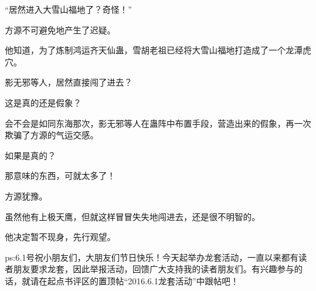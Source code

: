 \begin{this_body}
“居然进入大雪山福地了？奇怪！”

方源不可避免地产生了迟疑。

他知道，为了炼制鸿运齐天仙蛊，雪胡老祖已经将大雪山福地打造成了一个龙潭虎穴。

影无邪等人，居然直接闯了进去？

这是真的还是假象？

会不会是如同东海那次，影无邪等人在蛊阵中布置手段，营造出来的假象，再一次欺骗了方源的气运交感。

如果是真的？

那意味的东西，可就太多了！

方源犹豫。

虽然他有上极天鹰，但就这样冒冒失失地闯进去，还是很不明智的。

他决定暂不现身，先行观望。

ps:6.1号祝小朋友们，大朋友们节日快乐！今天起举办龙套活动，一直以来都有读者朋友要求龙套，因此举报活动，回馈广大支持我的读者朋友们。有兴趣参与的话，就请在起点书评区的置顶帖“2016.6.1龙套活动”中跟帖吧！

\end{this_body}

